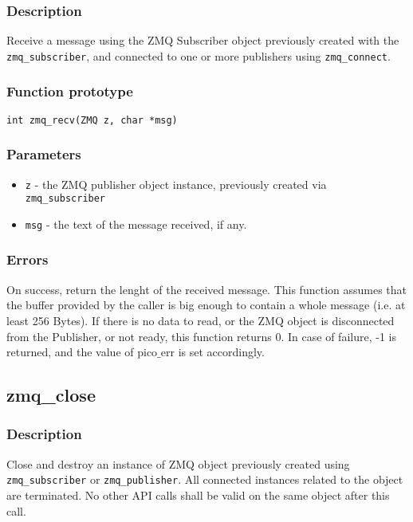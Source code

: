 \subsubsection*{Description}
Receive a message using the ZMQ Subscriber object previously created with the \texttt{zmq\_subscriber}, and connected to one or more publishers using \texttt{zmq\_connect}. 

\subsubsection*{Function prototype}
\begin{verbatim}
int zmq_recv(ZMQ z, char *msg)
\end{verbatim}

\subsubsection*{Parameters}
\begin{itemize}[noitemsep]
\item \texttt{z} - the ZMQ publisher object instance, previously created via \texttt{zmq\_subscriber} 
\item \texttt{msg} - the text of the message received, if any.
\end{itemize}

\subsubsection*{Errors}
On success, return the lenght of the received message. This function assumes that the buffer provided by the caller is big enough to contain a whole message (i.e. at least 256 Bytes).
If there is no data to read, or the ZMQ object is disconnected from the Publisher, or not ready, this function returns 0.
In case of failure, -1 is returned, and the value of pico$\_$err
is set accordingly.

\subsection{zmq\_close}
\subsubsection*{Description}
Close and destroy an instance of ZMQ object previously created using \texttt{zmq\_subscriber} or \texttt{zmq\_publisher}. All connected instances related to the object are terminated. No other API calls shall be valid on the same object after this call.

